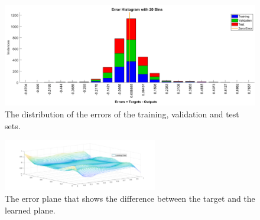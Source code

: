 \documentclass[a4paper,10pt]{article}
\begin{document}

\begin{figure}[h!]
	\centering
	\includegraphics[width=1\textwidth]{After_simulation_of_5min_per.png}
	\caption{The distribution of the errors of the training, validation and test sets.}
	\label{fig:After_simulation_of_5min_per}
\end{figure}




\begin{figure}[h!]
	\centering
	\includegraphics[width=0.6\textwidth]{errorSurface.png}
	\caption{The error plane that shows the difference between the target and the learned plane.}
	\label{fig:errorSurface}
\end{figure}


\end{document}
